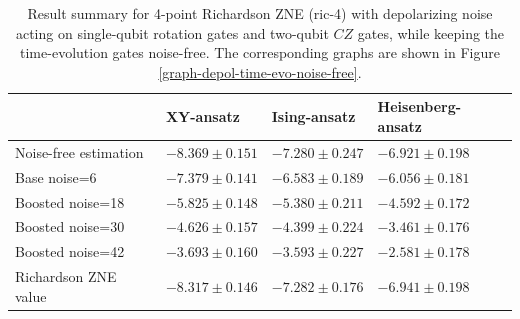 \begin{table}[h]
\caption{Result summary for 4-point Richardson ZNE (ric-4) with depolarizing noise acting on single-qubit rotation gates and two-qubit $CZ$ gates, while keeping the time-evolution gates noise-free. The corresponding graphs are shown in Figure \ref{graph-depol-time-evo-noise-free}.}
\begin{tabular}{@{}llll@{}}
\toprule
  & XY-ansatz  & Ising-ansatz  & Heisenberg-ansatz\\
\midrule
Noise-free estimation & $-8.369 \pm 0.151$ & $-7.280 \pm 0.247$ & $-6.921 \pm 0.198$ \\
\midrule
Base noise=6 & $-7.379 \pm 0.141$ & $-6.583 \pm 0.189$ & $-6.056 \pm 0.181$ \\
Boosted noise=18 & $-5.825 \pm 0.148$ & $-5.380 \pm 0.211$ & $-4.592 \pm 0.172$ \\
Boosted noise=30 & $-4.626 \pm 0.157$ & $-4.399 \pm 0.224$ & $-3.461 \pm 0.176$ \\
Boosted noise=42 & $-3.693 \pm 0.160$ & $-3.593 \pm 0.227$ & $-2.581 \pm 0.178$ \\
\midrule
Richardson ZNE value & $-8.317 \pm 0.146$ & $-7.282 \pm 0.176$ & $-6.941 \pm 0.198$ \\
\bottomrule
\end{tabular}
\label{table-depol-noise-free-time-evo}
\end{table}
